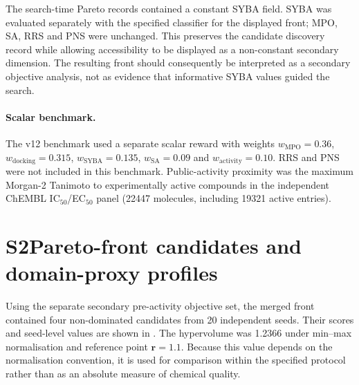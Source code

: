 \documentclass[10pt,a4paper]{article}
\begin{document}
The search-time Pareto records contained a constant SYBA field. SYBA was
evaluated separately with the specified classifier for the displayed front;
MPO, SA, RRS and PNS were unchanged. This preserves the candidate discovery
record while allowing accessibility to be displayed as a non-constant secondary
dimension. The resulting front should consequently be interpreted as a secondary
objective analysis, not as evidence that informative SYBA values guided the search.

\paragraph{Scalar benchmark.}
The v12 benchmark used a separate scalar reward with weights
$w_{\mathrm{MPO}}=\num{0.36}$, $w_{\mathrm{docking}}=\num{0.315}$,
$w_{\mathrm{SYBA}}=\num{0.135}$, $w_{\mathrm{SA}}=\num{0.09}$ and
$w_{\mathrm{activity}}=\num{0.10}$. RRS and PNS were not included in this
benchmark. Public-activity proximity was the maximum Morgan-2 Tanimoto to
experimentally active compounds in the independent ChEMBL IC$_{50}$/EC$_{50}$
panel (\num{22447} molecules, including \num{19321} active entries).

\section*{S2\hspace{0.6em}Pareto-front candidates and domain-proxy profiles}

Using the separate secondary pre-activity objective set, the merged front contained four non-dominated candidates from
\num{20} independent seeds. Their scores and seed-level values are shown
in . The hypervolume was \num{1.2366} under min--max
normalisation and reference point $\mathbf{r}=\num{1.1}$. Because this value
depends on the normalisation convention, it is used for comparison within the
specified protocol rather than as an absolute measure of chemical quality.
\end{document}
